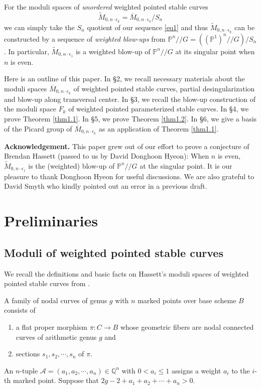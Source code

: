 \documentclass[10pt]{amsart}
\theoremstyle{definition}
\newcommand{\PP}{\mathbb{P}}
\def\Mzek{\overline{M}_{0,n\cdot \epsilon_k} }
\def\git{/\!/ }
\begin{document}
\bigskip

For the moduli spaces of \emph{unordered} weighted pointed stable
curves \[\widetilde{M}_{0,n\cdot\epsilon_k}=\Mzek/S_n\] we can
simply take the $S_n$ quotient of our sequence \eqref{eq1} and
thus $\widetilde{M}_{0,n\cdot\epsilon_k}$ can be constructed by a
sequence of \emph{weighted blow-ups} from $\PP^n\git
G=\left((\PP^1)^n\git G\right)/S_n$. In particular,
$\widetilde{M}_{0,n\cdot\epsilon_1}$ is a weighted blow-up of
$\PP^n\git G$ at its singular point when $n$ is even.

\bigskip

Here is an outline of this paper. In \S2, we recall necessary
materials about the moduli spaces $\Mzek$ of weighted pointed stable
curves, partial desingularization and blow-up along transversal
center. In \S3, we recall the blow-up construction of the moduli
space $F_k$ of weighted pointed parameterized stable curves. In \S4,
we prove Theorem \ref{thm1.1}. In \S5, we prove Theorem
\ref{thm1.2}. In \S6, we give a basis of the Picard group of $\Mzek$
as an application of Theorem \ref{thm1.1}.

\bigskip

\textbf{Acknowledgement.} This paper grew out of our effort to
prove a conjecture of Brendan Hassett (passed to us by David
Donghoon Hyeon): When $n$ is even,
$\widetilde{M}_{0,n\cdot\epsilon_1}$ is the (weighted) blow-up of
$\PP^n\git G$ at the singular point. It is our pleasure to thank
Donghoon Hyeon for useful discussions. We are also grateful to
David Smyth who kindly pointed out an error in a previous draft.

\section{Preliminaries}\label{sec2}

\subsection{Moduli of weighted pointed stable curves}\label{sec2.1}
We recall the definitions and basic facts on Hassett's moduli
spaces of weighted pointed stable curves from \cite{Hassett}.

A family of nodal curves of genus $g$ with $n$ marked points over
base scheme $B$ consists of
\begin{enumerate}
\item a flat proper
morphism $\pi : C \to B$ whose geometric fibers are nodal
connected curves of arithmetic genus $g$ and
\item sections $s_1, s_2, \cdots, s_n$ of $\pi$.
\end{enumerate}
An $n$-tuple
$\mathcal{A} =(a_1, a_2, \cdots, a_n) \in \mathbb{Q}^n$ with $0 <
a_i \le 1$ assigns a weight $a_i$ to the $i$-th marked point.
Suppose that $2g-2+a_1+a_2+\cdots+a_n > 0$.
\end{document}

